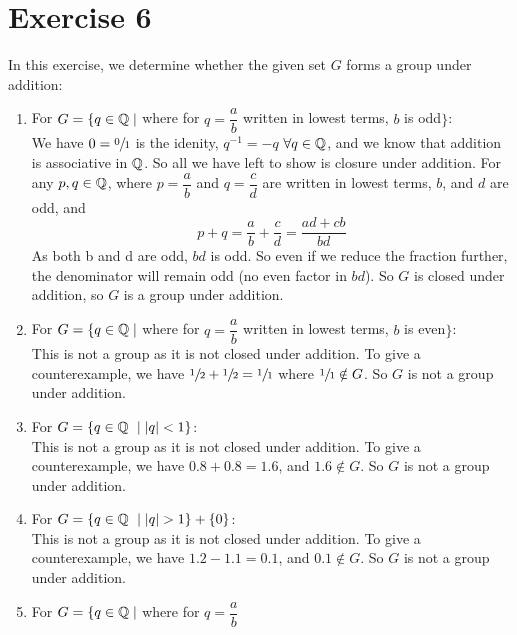 \documentclass[12pt]{article}
\begin{document}
    \section*{Exercise 6}
    In this exercise, we determine whether the given set $G$ forms a group
    under addition:
    \begin{enumerate}[label=\textbf{\alph*.}]
        \item
            For $G = \{q \in \mathbb{Q} \mid$ where for $q = \dfrac{a}{b}$
            written in lowest terms, $b$ is odd$\}$: \\
            We have $0 = \sfrac{0}{1}$ is the idenity,
            $q^{-1} = -q$ $\forall q \in \mathbb{Q}$,
            and we know that addition is associative in $\mathbb{Q}$.
            So all we have left to show is closure under addition.
            For any $p, q \in \mathbb{Q}$,
            where $p = \dfrac{a}{b}$ and $q = \dfrac{c}{d}$
            are written in lowest terms, $b$, and $d$ are odd,
            and \[p + q = \dfrac{a}{b} + \dfrac{c}{d} = \dfrac{ad + cb}{bd}\]
            As both b and d are odd, $bd$ is odd.
            So even if we reduce the fraction further,
            the denominator will remain odd (no even factor in $bd$).
            So $G$ is closed under addition,
            so $G$ is a group under addition.
        \item
            For $G = \{q \in \mathbb{Q} \mid$ where for $q = \dfrac{a}{b}$
            written in lowest terms, $b$ is even$\}$: \\
            This is not a group as it is not closed under addition.
            To give a counterexample,
            we have $\sfrac{1}{2} + \sfrac{1}{2} = \sfrac{1}{1}$
            where $\sfrac{1}{1} \notin G$.
            So $G$ is not a group under addition.
        \item
            For $G = \{q \in \mathbb{Q}\ \mid |q| < 1\}$: \\
            This is not a group as it is not closed under addition.
            To give a counterexample,
            we have $0.8 + 0.8 = 1.6$, and $1.6 \notin G$.
            So $G$ is not a group under addition.
        \item
            For $G = \{q \in \mathbb{Q}\ \mid |q| > 1\} + \{0\}$: \\
            This is not a group as it is not closed under addition.
            To give a counterexample,
            we have $1.2 - 1.1 = 0.1$, and $0.1 \notin G$.
            So $G$ is not a group under addition.
        \item
            For $G = \{q \in \mathbb{Q} \mid$ where for $q = \dfrac{a}{b}$

\end{enumerate}
\end{document}
